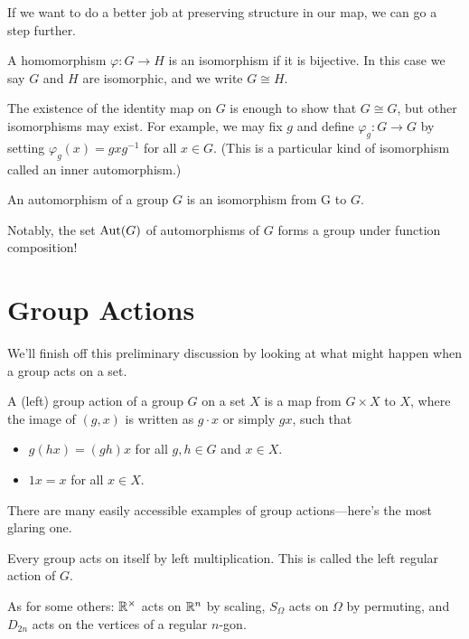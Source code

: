 \documentclass[../m171main.tex]{subfiles}
\begin{document}
If we want to do a better job at preserving structure in our map, we can go a step further.

\begin{definition}[Isomorphism]
    A homomorphism $\varphi : G \to H$ is an isomorphism if it is bijective.
    In this case we say $G$ and $H$ are isomorphic, and we write $G \cong H$.
\end{definition}

The existence of the identity map on $G$ is enough to show that $G \cong G$, but other isomorphisms may exist.
For example, we may fix $g$ and define $\varphi_g : G \to G$ by setting $\varphi_g(x) = g x g^{-1}$ for all $x \in G$.
(This is a particular kind of isomorphism called an inner automorphism.)

\begin{definition}[Automorphism]
    An automorphism of a group $G$ is an isomorphism from G to $G$.
\end{definition}

Notably, the set $\textrm{Aut}(G)$ of automorphisms of $G$ forms a group under function composition!

\section{Group Actions}
We'll finish off this preliminary discussion by looking at what might happen when a group acts on a set.

\begin{definition}
    A (left) group action of a group $G$ on a set $X$ is a map from $G \times X$ to $X$, where the image of $(g,x)$ is written as $g \cdot x$ or simply $gx$, such that
    \begin{itemize}
        \item $g(hx) = (gh)x$ for all $g,h \in G$ and $x \in X$.
        \item $1x = x$ for all $x \in X$.
    \end{itemize}
\end{definition}

There are many easily accessible examples of group actions---here's the most glaring one.

\begin{definition}
    Every group acts on itself by left multiplication.
    This is called the left regular action of $G$.
\end{definition}

As for some others: $\mathbb{R}^\times$ acts on $\mathbb{R}^n$ by scaling, $S_\Omega$ acts on $\Omega$ by permuting, and $D_{2n}$ acts on the vertices of a regular $n$-gon.
\end{document}
